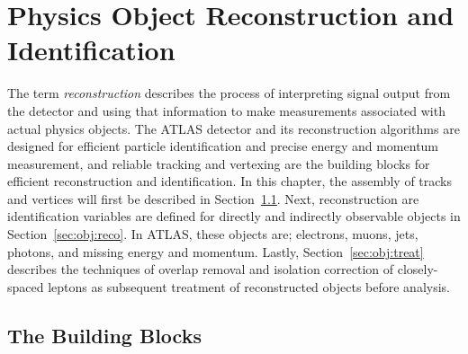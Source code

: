 \chapter{Physics Object Reconstruction and Identification}
\label{ch:obj}
The term \textit{reconstruction} describes the process of interpreting signal output from the detector and using that information to make measurements associated with actual physics objects.  The ATLAS detector and its reconstruction algorithms are designed for efficient particle identification and precise energy and momentum measurement, and reliable tracking and vertexing are the building blocks for efficient reconstruction and identification.  In this chapter, the assembly of tracks and vertices will first be described in Section~\ref{sec:obj:bb}.  Next, reconstruction are identification variables are defined for directly and indirectly observable objects in Section~\ref{sec:obj:reco}.  In ATLAS, these objects are; electrons, muons, jets, photons, and missing energy and momentum.  Lastly, Section~\ref{sec:obj:treat} describes the techniques of overlap removal and isolation correction of closely-spaced leptons as subsequent treatment of reconstructed objects before analysis.  

\section{The Building Blocks}
\label{sec:obj:bb}

